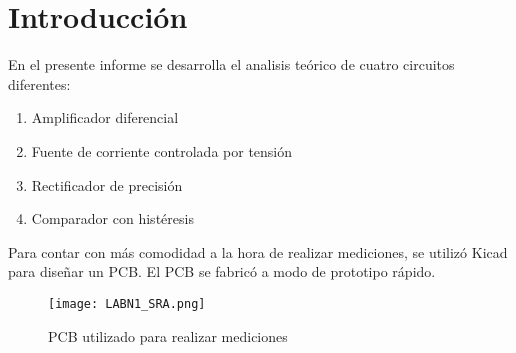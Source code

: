 \documentclass{article}
\begin{document}

\newpage

\tableofcontents
\newpage



\section{Introducción}

En el presente informe se desarrolla el analisis teórico de cuatro circuitos diferentes: 

\begin{enumerate}
    \item Amplificador diferencial
    \item Fuente de corriente controlada por tensión
    \item Rectificador de precisión
    \item Comparador con histéresis
\end{enumerate}

Para contar con más comodidad a la hora de realizar mediciones, se utilizó Kicad para diseñar un PCB. El PCB se fabricó a modo de prototipo rápido.

\begin{figure}[H]
    \centering
    \texttt{[image: LABN1\_SRA.png]}
    \caption{PCB utilizado para realizar mediciones}
    \label{fig:enter-label}
\end{figure}


\newpage


\newpage

 
\newpage


\newpage



\printbibliography
\end{document}
